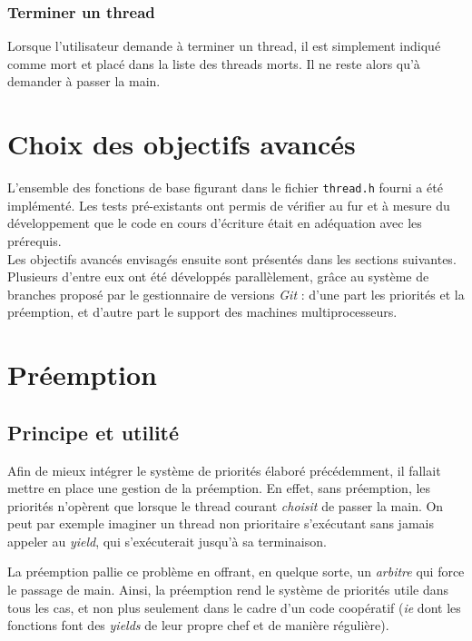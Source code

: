 \documentclass[a4paper,11pt]{article}
\begin{document}
\subsubsection*{Terminer un thread}

Lorsque l'utilisateur demande à terminer un thread, il est simplement indiqué comme mort et placé dans la liste des threads morts. Il ne reste alors qu'à demander à passer la main.





\section{Choix des objectifs avancés}

L’ensemble des fonctions de base figurant dans le fichier \texttt{thread.h} fourni a été implémenté. Les tests pré-existants ont permis de vérifier au fur et à mesure du développement que le code en cours
d’écriture était en adéquation avec les prérequis.\\

Les objectifs avancés envisagés ensuite sont présentés dans les sections suivantes. Plusieurs d'entre eux ont été développés parallèlement, grâce au système de branches proposé par le gestionnaire de versions \textit{Git} : d'une part les priorités et la préemption, et d'autre part le support des machines multiprocesseurs.

\section{Préemption}

\subsection{Principe et utilité}

Afin de mieux intégrer le système de priorités élaboré précédemment, il fallait mettre en place une gestion de la préemption. En effet, sans préemption, les priorités n'opèrent que lorsque le thread courant \textit{choisit} de passer la main. On peut par exemple imaginer un thread non prioritaire s'exécutant sans jamais appeler au \textit{yield}, qui s'exécuterait jusqu'à sa terminaison.

La préemption pallie ce problème en offrant, en quelque sorte, un \textit{arbitre} qui force le passage de main. Ainsi, la préemption rend le système de priorités utile dans tous les cas, et non plus seulement dans le cadre d'un code coopératif (\textit{ie} dont les fonctions font des \textit{yields} de leur propre chef et de manière régulière).
\end{document}
